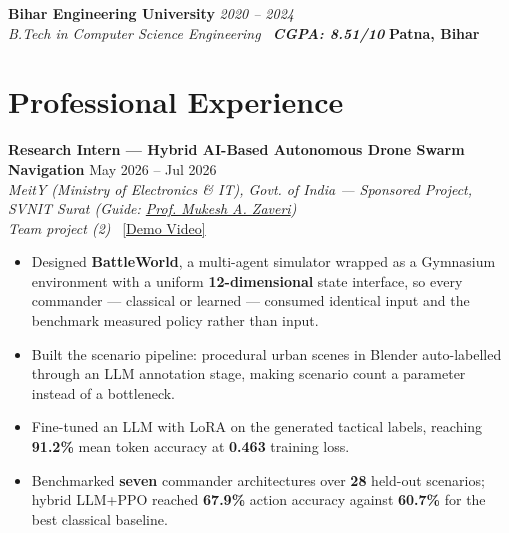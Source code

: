 \documentclass[10pt, legalpaper]{article}
\newcommand{\eduentry}[4]{%
    \noindent\textbf{#1} \hfill \textit{\color{medgray}#2}\\[1pt]
    \noindent\textit{\color{darkgray}#3} \hfill \textbf{#4}\\[2pt]
}
\newcommand{\expentry}[3]{%
    \noindent\textbf{#1} \hfill {\small #3}\\[1pt]
    \noindent\textit{#2}\\[2pt]
}
\begin{document}
\vspace{-2mm}
\eduentry
{Bihar Engineering University}
{2020 -- 2024}
{B.Tech in Computer Science Engineering \textbar\ \textbf{CGPA: 8.51/10}}
{Patna, Bihar}

\vspace{-2mm}
\section{Professional Experience}

\expentry
{Research Intern --- Hybrid AI-Based Autonomous Drone Swarm Navigation}
{MeitY (Ministry of Electronics \& IT), Govt. of India --- Sponsored Project, SVNIT Surat (Guide: \href{https://svnit.ac.in/maz/}{Prof. Mukesh A. Zaveri})}
{May 2026 -- Jul 2026}
\vspace{-2pt}
 \hfill {\small\textit{\color{medgray}Team project (2)} \textbar\ \href{https://drive.google.com/file/d/1zHO33qPGtrWtDfhehBWT-QbK_ZDj5pvY/view?usp=sharing}{[Demo Video]}}\\[2pt]
\vspace{-4mm}
\begin{itemize}
\item Designed \textbf{BattleWorld}, a multi-agent simulator wrapped as a Gymnasium environment with a uniform \textbf{12-dimensional} state interface, so every commander --- classical or learned --- consumed identical input and the benchmark measured policy rather than input.
\item Built the scenario pipeline: procedural urban scenes in Blender auto-labelled through an LLM annotation stage, making scenario count a parameter instead of a bottleneck.
\item Fine-tuned an LLM with LoRA on the generated tactical labels, reaching \textbf{91.2\%} mean token accuracy at \textbf{0.463} training loss.
\item Benchmarked \textbf{seven} commander architectures over \textbf{28} held-out scenarios; hybrid LLM+PPO reached \textbf{67.9\%} action accuracy against \textbf{60.7\%} for the best classical baseline.
\end{itemize}

\vspace{1pt}
\end{document}
